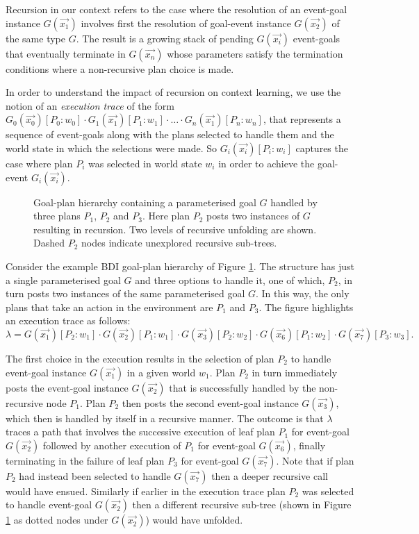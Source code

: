 Recursion in our context refers to the case where the resolution of an event-goal instance $G(\vec{x_1})$ involves first the resolution of goal-event instance $G(\vec{x_2})$ of the same type $G$. The result is a growing stack of pending $G(\vec{x_i})$ event-goals that eventually terminate in $G(\vec{x_n})$ whose parameters satisfy the termination conditions where a non-recursive plan choice is made.

In order to understand the impact of recursion on context learning, we use the notion of an \textit{execution trace} of the form $G_0(\vec{x_0})[P_0:w_0] \cdot G_1(\vec{x_1})[P_1:w_1] \cdot \ldots \cdot G_n(\vec{x_1})[P_n:w_n]$, that represents a sequence of event-goals along with the plans selected to handle them and the world state in which the selections were made. So $G_i(\vec{x_i})[P_i:w_i]$ captures the case where plan $P_i$ was selected in world state $w_i$ in order to achieve the goal-event $G_i(\vec{x_i})$.

\begin{figure}[t]
\begin{center}
\resizebox{0.6\textwidth}{!}{

}
\end{center}
\vskip -0.5cm
\caption{Goal-plan hierarchy containing a parameterised goal $G$ handled by three plans $P_1$, $P_2$ and $P_3$. Here plan $P_2$ posts two instances of $G$ resulting in recursion. Two levels of recursive unfolding are shown. Dashed $P_2$ nodes indicate unexplored recursive sub-trees.}
\label{fig:unfolding}
\end{figure}

Consider the example BDI goal-plan hierarchy of Figure \ref{fig:unfolding}. The structure has just a single parameterised goal $G$ and three options to handle it, one of which, $P_2$, in turn posts two instances of the same parameterised goal $G$. In this way, the only plans that take an action in the environment are $P_1$ and $P_3$. The figure highlights an execution trace as follows: \[
\lambda=G(\vec{x_1})[P_2:w_1] \cdot G(\vec{x_2})[P_1:w_1] \cdot G(\vec{x_3})[P_2:w_2] \cdot G(\vec{x_6})[P_1:w_2] \cdot G(\vec{x_7})[P_3:w_3].
\]

The first choice in the execution results in the selection of plan $P_2$ to handle event-goal instance $G(\vec{x_1})$ in a given world $w_1$. Plan $P_2$ in turn immediately posts the event-goal instance $G(\vec{x_2})$ that is successfully handled by the non-recursive node $P_1$. Plan $P_2$ then posts the second event-goal instance $G(\vec{x_3})$, which then is handled by itself in a recursive manner.  The outcome is that $\lambda$ traces a path that involves the successive execution of leaf plan $P_1$ for event-goal $G(\vec{x_2})$ followed by another execution of $P_1$ for event-goal $G(\vec{x_6})$, finally terminating in the failure of leaf plan $P_3$ for event-goal $G(\vec{x_7})$. Note that if plan $P_2$ had instead been selected to handle $G(\vec{x_7})$ then a deeper recursive call would have ensued. Similarly if earlier in the execution trace plan $P_2$ was selected to handle event-goal $G(\vec{x_2})$ then a different recursive sub-tree (shown in Figure \ref{fig:unfolding} as dotted nodes under $G(\vec{x_2})$) would have unfolded.

